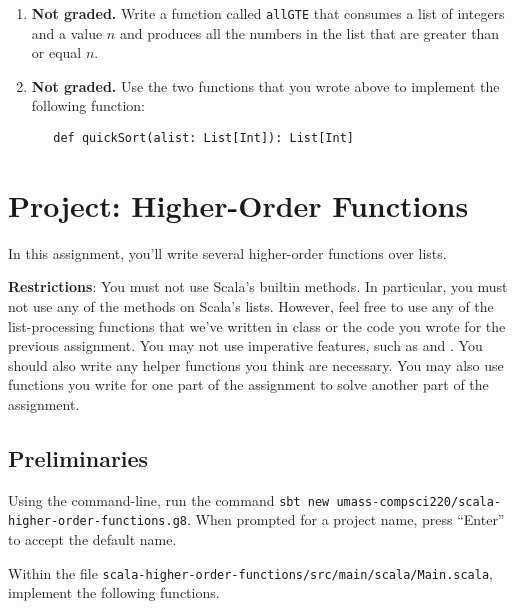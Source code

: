 \documentclass[9pt]{extbook}
\begin{document}
\begin{enumerate}
   \item \textbf{Not graded.} Write a function called \lstinline|allGTE|
   that consumes a list of integers and a value $n$ and produces all the numbers
   in the list that are greater than or equal $n$.

   \item \textbf{Not graded.} Use the two functions that you wrote above
   to implement the following function:
   \begin{lstlisting}
   def quickSort(alist: List[Int]): List[Int]
   \end{lstlisting}

\end{enumerate}



\chapter{Project: Higher-Order Functions}

In this assignment, you'll write several higher-order functions over lists.

\textbf{Restrictions}: You must not use Scala's builtin methods. In particular, you must not
use any of the methods on Scala's lists. However, feel free to use any of the list-processing
functions that we've written in class or the code you wrote for the previous assignment.
You
may not use imperative features, such as  and .
You should also write any helper functions you think are necessary. You
may also use functions you write for one part of the assignment to solve
another part of the assignment.

\section{Preliminaries}

Using the command-line, run the command
\verb|sbt new umass-compsci220/scala-higher-order-functions.g8|. When prompted for
a project name, press ``Enter'' to accept the default name.

Within the file \verb|scala-higher-order-functions/src/main/scala/Main.scala|,
implement the following functions.
\end{document}
